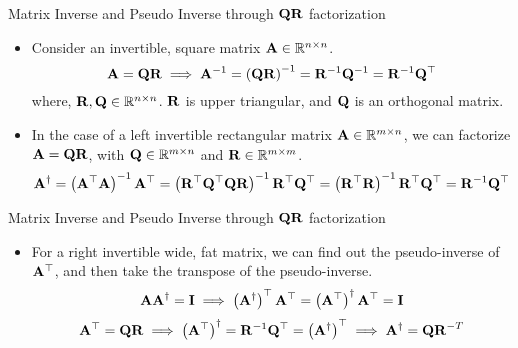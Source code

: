 \documentclass[aspectratio=169]{beamer}
\let\olditem\item
\renewcommand{\item}{\setlength{\itemsep}{\fill}\olditem}
\def\mf{\ensuremath\mathbf}
\def\mb{\ensuremath\mathbb}
\def\lV{\ensuremath\left\lVert}
\def\rV{\ensuremath\right\rVert}
\begin{document}






\begin{frame}[t]{Matrix Inverse and Pseudo Inverse through $\mf{QR}$ factorization}
\begin{itemize}
    \item Consider an invertible, square matrix $\mf{A} \in \mb{R}^{n \times n}$. 
    \[ \mf{A} = \mf{QR} \implies \mf{A}^{-1} = \left(\mf{QR}\right)^{-1} = \mf{R}^{-1}\mf{Q}^{-1} = \mf{R}^{-1}\mf{Q}^\top \] 
    where, $\mf{R}, \mf{Q} \in \mb{R}^{n \times n}$. $\mf{R}$ is upper triangular, and $\mf{Q}$ is an orthogonal matrix.
    
    \item In the case of a left invertible rectangular matrix $\mf{A} \in \mb{R}^{m \times n}$, we can factorize $\mf{A} = \mf{QR}$, with $\mf{Q} \in \mb{R}^{m \times n}$ and $\mf{R} \in \mb{R}^{m \times m}$.
    \[ \mf{A}^{\dagger} = \left(\mf{A}^\top\mf{A}\right)^{-1}\mf{A}^\top = \left(\mf{R}^\top\mf{Q}^\top\mf{QR}\right)^{-1}\mf{R}^\top\mf{Q}^\top = \left(\mf{R}^\top\mf{R}\right)^{-1}\mf{R}^\top\mf{Q}^\top = \mf{R}^{-1}\mf{Q}^\top \]
\end{itemize}
\end{frame}


\begin{frame}[t]{Matrix Inverse and Pseudo Inverse through $\mf{QR}$ factorization}
\begin{itemize}
    \item For a right invertible wide, fat matrix, we can find out the pseudo-inverse of $\mf{A}^\top$, and then take the transpose of the pseudo-inverse.
    \[ \mf{AA}^{\dagger} = \mf{I} \implies \left(\mf{A}^{\dagger}\right)^\top\mf{A}^\top = \left(\mf{A}^\top\right)^{\dagger}\mf{A}^\top = \mf{I} \]
    \[ \mf{A}^\top = \mf{QR} \implies \left(\mf{A}^\top\right)^{\dagger} = \mf{R}^{-1}\mf{Q}^\top = \left(\mf{A}^{\dagger}\right)^\top \implies  \mf{A}^{\dagger} = \mf{QR}^{-T} \]
\end{itemize}
\end{frame}
\end{document}
